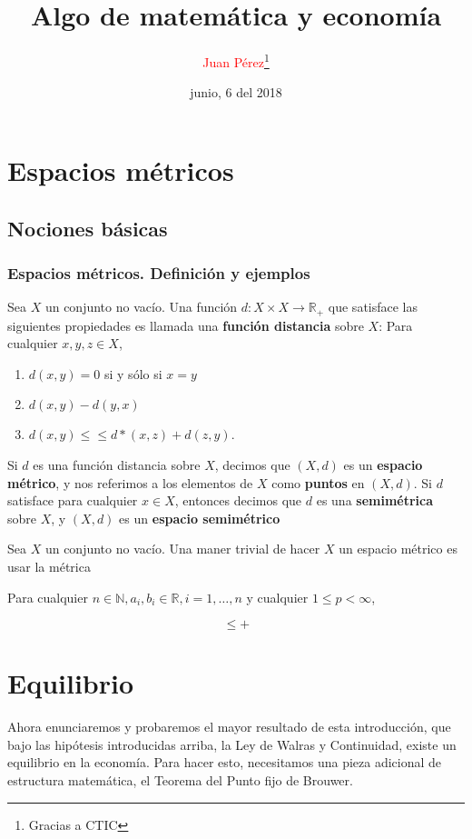 \documentclass{12pt,a4paper}{report}%
\title{Algo de matemática y economía}
\author{\textcolor{red}{Juan Pérez}\thanks{Gracias a CTIC}}
\date{junio, 6 del 2018}
\begin{document}
\tableofcontents
\listoffigures
\listoftables

\section{Espacios métricos}

\subsection{Nociones básicas}

\subsubsection{Espacios métricos. Definición y ejemplos}

Sea $X$ un conjunto no vacío. Una función $d:X\times X\rightarrow\mathbb{R}_{+}$ que satisface las siguientes propiedades es llamada una \textbf{función distancia} sobre $X$: Para cualquier $x,y,z\in X$,

\begin{enumerate}
	\item $d(x,y)=0$ si y sólo si $x=y$
	\item $d(x,y)-d(y,x)$
	\item $d(x,y)\leq\leq d*(x,z)+d(z,y)$.
\end{enumerate}

Si $d$ es una función distancia sobre $X$, decimos que $(X,d)$ es un \textbf{espacio métrico}, y nos referimos a los elementos de $X$ como \textbf{puntos} en $(X,d)$. Si $d$ satisface%
para cualquier $x\in X$, entonces decimos que $d$ es una \textbf{semimétrica} sobre $X$, y $(X,d)$ es un \textbf{espacio semimétrico}

Sea $X$ un conjunto no vacío. Una maner trivial de hacer $X$ un espacio métrico es usar la métrica

Para cualquier $n\in\mathbb{N}, a_i, b_i\in\mathbb{R}, i=1,\ldots,n$ y cualquier $1\leq p<\infty$,

$$
^{}\leq+
$$

\section{Equilibrio}

Ahora enunciaremos y probaremos el mayor resultado de esta introducción, que bajo las hipótesis introducidas arriba, la Ley de Walras y Continuidad, existe un equilibrio en la economía. Para hacer esto, necesitamos una pieza adicional de estructura matemática, el Teorema del Punto fijo de Brouwer.
\end{document}

